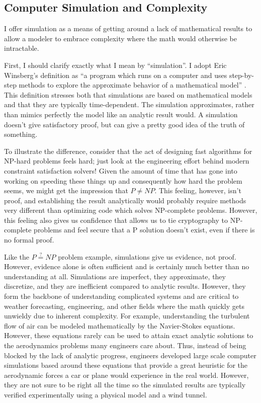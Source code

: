 \hypertarget{computer-simulation-and-complexity}{%
\subsection{Computer Simulation and
Complexity}\label{computer-simulation-and-complexity}}

I offer simulation as a means of getting around a lack of mathematical
results to allow a modeler to embrace complexity where the math would
otherwise be intractable.

First, I should clarify exactly what I mean by ``simulation''. I adopt
Eric Winsberg's definition as ``a program which runs on a computer and
uses step-by-step methods to explore the approximate behavior of a
mathematical model'' \autocite{winsbergComputerSimulationsScience2019}.
This definition stresses both that simulations are based on mathematical
models and that they are typically time-dependent. The simulation
approximates, rather than mimics perfectly the model like an analytic
result would. A simulation doesn't give satisfactory proof, but can give
a pretty good idea of the truth of something.

To illustrate the difference, consider that the act of designing fast
algorithms for NP-hard problems feels hard; just look at the engineering
effort behind modern constraint satisfaction solvers! Given the amount
of time that has gone into working on speeding these things up and
consequently how hard the problem seems, we might get the impression
that \(P \neq NP\). This feeling, however, isn't proof, and establishing
the result analytically would probably require methods very different
than optimizing code which solves NP-complete problems. However, this
feeling also gives us confidence that allows us to tie cryptography to
NP-complete problems and feel secure that a P solution doesn't exist,
even if there is no formal proof.

Like the \(P \stackrel{?}{=} NP\) problem example, simulations give us
evidence, not proof. However, evidence alone is often sufficient and is
certainly much better than no understanding at all. Simulations are
imperfect, they approximate, they discretize, and they are inefficient
compared to analytic results. However, they form the backbone of
understanding complicated systems and are critical to weather
forecasting, engineering, and other fields where the math quickly gets
unwieldy due to inherent complexity. For example, understanding the
turbulent flow of air can be modeled mathematically by the Navier-Stokes
equations. However, these equations rarely can be used to attain exact
analytic solutions to the aerodynamics problems many engineers care
about. Thus, instead of being blocked by the lack of analytic progress,
engineers developed large scale computer simulations based around these
equations that provide a great heuristic for the aerodynamic forces a
car or plane would experience in the real world. However, they are not
sure to be right all the time so the simulated results are typically
verified experimentally using a physical model and a wind tunnel.

